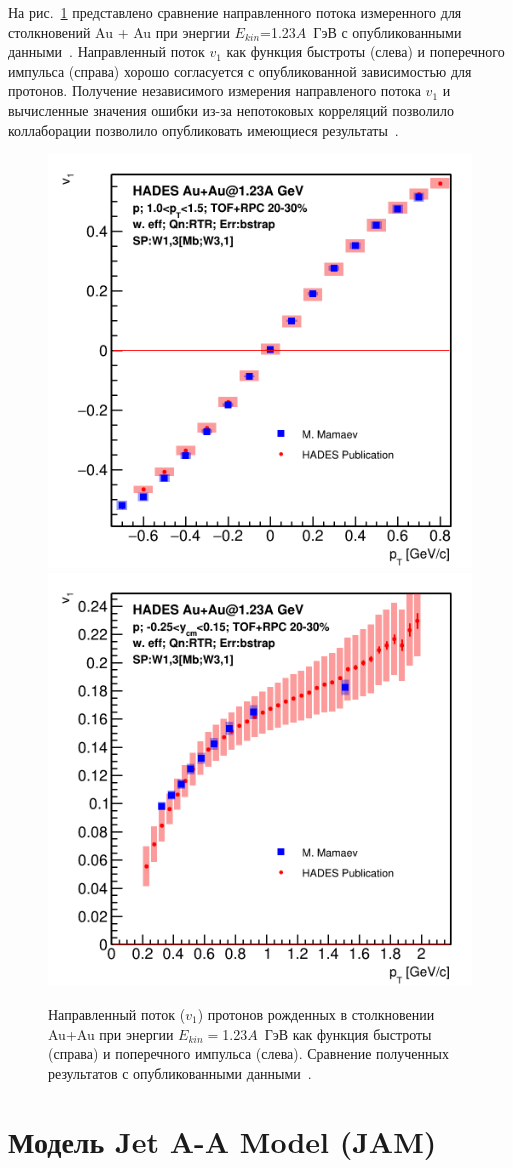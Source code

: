 На рис.~\ref{fig:hades_v1_publ_comparison} представлено сравнение направленного потока измеренного для столкновений Au + Au при энергии $E_{kin}$=1.23$A$~ГэВ с опубликованными данными~\cite{HADES:2020lob}.
Направленный поток $v_1$ как функция быстроты (слева) и поперечного импульса (справа) хорошо согласуется с опубликованной зависимостью для протонов.
Получение независимого измерения направленого потока $v_1$ и вычисленные значения ошибки из-за непотоковых корреляций позволило коллаборации позволило опубликовать имеющиеся результаты~\cite{Mamaev:2020lpi,Mamaev:2023fpr}.
%
\begin{figure}[ht]
\begin{center}
\includegraphics[width=0.45\linewidth]{images/v1_au123_publication_ycm.png}
\includegraphics[width=0.45\linewidth]{images/v1_au123_publication_pT.png}
\caption{Направленный поток ($v_1$) протонов  рожденных в столкновении Au+Au при энергии $E_{kin}=$1.23$A$~ГэВ как функция быстроты (справа) и поперечного импульса (слева). Сравнение полученных результатов с опубликованными данными~\cite{HADES:2020lob}. }
\label{fig:hades_v1_publ_comparison}
\end{center}
\end{figure}

\section{Модель Jet A-A Model (JAM)}

